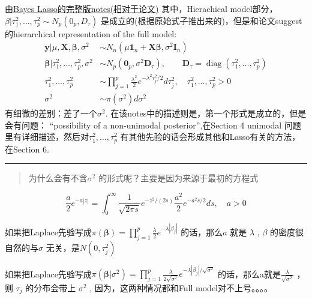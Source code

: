 \documentclass[
]{book}
\theoremstyle{definition}
\theoremstyle{definition}
\theoremstyle{definition}
\theoremstyle{remark}
\begin{document}
由\href{\%5Bhttp://www.math.chalmers.se/Stat/Grundutb/GU/MSA220/S16/bayeslasso.pdf\%5D(http://www.math.chalmers.se/Stat/Grundutb/GU/MSA220/S16/bayeslasso.pdf)}{Bayes Lasso的完整版notes(相对于论文)} 其中，Hierachical model部分，\(\beta|\tau_1^2,…,\tau^2_p\sim N_p(0_p,D_\tau)\) 是成立的(根据原始式子推出来的)，但是和论文suggest的hierarchical representation of the full model:
\[
\begin{aligned} \boldsymbol{y} | \mu, \boldsymbol{X}, \boldsymbol{\beta}, \sigma^{2} & \sim N_{n}\left(\mu \mathbf{1}_{n}+\boldsymbol{X} \boldsymbol{\beta}, \sigma^{2} \boldsymbol{I}_{n}\right) \\ \boldsymbol{\beta} | \tau_{1}^{2}, \ldots, \tau_{p}^{2}, \sigma^{2} & \sim N_{p}\left(\mathbf{0}_{p}, \sigma^{2} \boldsymbol{D}_{\tau}\right), \qquad \boldsymbol{D}_{\tau}=\operatorname{diag}\left(\tau_{1}^{2}, \ldots, \tau_{p}^{2}\right) \\ \tau_{1}^{2}, \ldots, \tau_{p}^{2} & \sim \prod_{j=1}^{p} \frac{\lambda^{2}}{2} e^{-\lambda^{2} \tau_{j}^{2} / 2} d \tau_{j}^{2}, \quad \tau_{1}^{2}, \ldots, \tau_{p}^{2}>0 \\ \sigma^{2} & \sim \pi\left(\sigma^{2}\right) d \sigma^{2} \end{aligned}
\]
有细微的差别：差了一个\(\sigma^2\). 在该notes中的描述则是，第一个形式是成立的，但是会有问题： ``possibility of a non-unimodal posterior'',在Section 4 unimodal 问题里有详细描述，然后对\(\tau^2_1,…,\tau^2_p\) 有其他先验的话会形成其他和Lasso有关的方法，在Section 6.

\begin{center}\rule{0.5\linewidth}{0.5pt}\end{center}

\begin{quote}
为什么会有不含\(\sigma^2\) 的形式呢？主要是因为来源于最初的方程式
\end{quote}

\[
\frac{a}{2} e^{-a|z|}=\int_{0}^{\infty} \frac{1}{\sqrt{2 \pi s}} e^{-z^{2} /(2 s)} \frac{a^{2}}{2} e^{-a^{2} s / 2} d s, \quad a>0
\]

如果把Laplace先验写成\(\pi(\boldsymbol{\beta})=\prod_{j=1}^{p} \frac{\lambda}{2} e^{-\lambda\left|\beta_{j}\right|}\) 的话，那么\(a\) 就是 \(\lambda\) , \(\beta\) 的密度很自然的与\(\sigma\) 无关，是\(N(0,\tau_j^2)\)

如果把Laplace先验写成\(\pi\left(\boldsymbol{\beta} | \sigma^{2}\right)=\prod_{j=1}^{p} \frac{\lambda}{2 \sqrt{\sigma^{2}}} e^{-\lambda\left|\beta_{j}\right| / \sqrt{\sigma^{2}}}\) 的话，那么a就是\(\frac{\lambda}{\sqrt{\sigma^2}}\) ，则 \(\tau_j\) 的分布会带上 \(\sigma^2\) , 因为，这两种情况都和Full model对不上号。。。。
\end{document}
